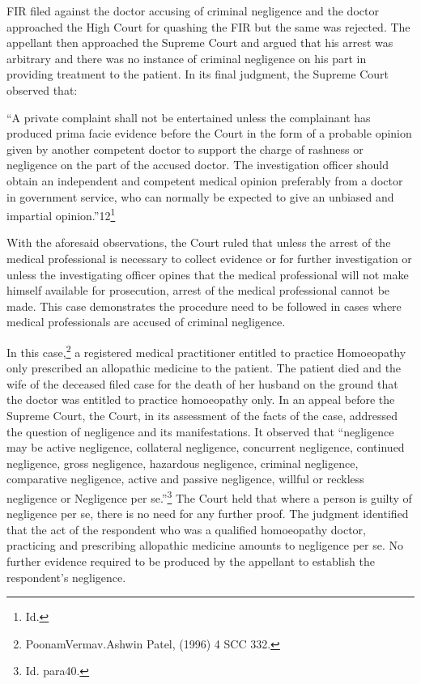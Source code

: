 \begin{multicols}{2}
\vspace{-.1cm}

\noi
FIR filed against the doctor accusing of criminal negligence and the doctor approached the High
Court for quashing the FIR but the same was rejected. The appellant then approached the Supreme
Court and argued that his arrest was arbitrary and there was no instance of criminal negligence
on his part in providing treatment to the patient. In its final judgment, the Supreme Court observed
that:

\vspace{-.1cm}

\noi
“A private complaint shall not be entertained unless the complainant has produced prima facie
evidence before the Court in the form of a probable opinion given by another competent doctor
to support the charge of rashness or negligence on the part of the accused doctor. The investigation
officer should obtain an independent and competent medical opinion preferably from a doctor in
government service, who can normally be expected to give an unbiased and impartial opinion.”12\footnote{Id.}

\vspace{-.1cm}

\noi
With the aforesaid observations, the Court ruled that unless the arrest of the medical professional
is necessary to collect evidence or for further investigation or unless the investigating officer
opines that the medical professional will not make himself available for prosecution, arrest of the
medical professional cannot be made. This case demonstrates the procedure need to be followed
in cases where medical professionals are accused of criminal negligence.

\vspace{-.1cm}


\vspace{-.1cm}

\noi
In this case,\footnote{PoonamVermav.Ashwin Patel, (1996) 4 SCC 332.} a registered medical practitioner entitled to practice Homoeopathy only prescribed
an allopathic medicine to the patient. The patient died and the wife of the deceased filed case for
the death of her husband on the ground that the doctor was entitled to practice homoeopathy only.
In an appeal before the Supreme Court, the Court, in its assessment of the facts of the case,
addressed the question of negligence and its manifestations. It observed that “negligence may be
active negligence, collateral negligence, concurrent negligence, continued negligence, gross
negligence, hazardous negligence, criminal negligence, comparative negligence, active and
passive negligence, willful or reckless negligence or Negligence per se.”\footnote{Id. para40.} The Court held that
where a person is guilty of negligence per se, there is no need for any further proof. The judgment
identified that the act of the respondent who was a qualified homoeopathy doctor, practicing and
prescribing allopathic medicine amounts to negligence per se. No further evidence required to be
produced by the appellant to establish the respondent’s negligence.


\end{multicols}
